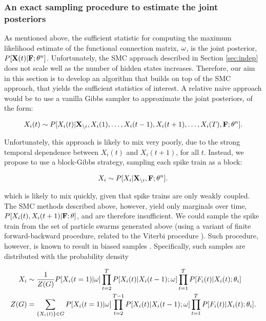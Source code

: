 \subsubsection{An exact sampling procedure to estimate the joint posteriors}

As mentioned above, the sufficient statistic for computing the maximum likelihood estimate of the functional connection matrix, $\mathbf{\omega}$, is the joint posterior, $P[{\bf X}(t) | {\bf F}; \mathbf{\theta}^n]$.  Unfortunately, the SMC approach described in Section \ref{sec:indep} does not scale well as the number of hidden states increases.  Therefore, our aim in this section is to develop an algorithm that builds on top of the SMC approach, that yields the sufficient statistics of interest.  A relative naive approach would be to use a vanilla Gibbs sampler to approximate the joint posteriors, of the form:

\begin{align}
	X_i(t) \sim P[X_i(t) | {\bf X}_{\backslash i}, X_i(1), \ldots, X_i(t-1), X_i(t+1), \ldots, X_i(T), {\bf F}; \mathbf{\theta}^n].
\end{align} 

\noindent Unfortunately, this approach is likely to mix very poorly, due to the strong temporal dependence between $X_i(t)$ and $X_i(t+1)$, for all $t$.  Instead, we propose to use a block-Gibbs strategy, sampling each spike train as a block:

\begin{align}
	X_i \sim P[X_i | {\bf X}_{\backslash i}, {\bf F}; \mathbf{\theta}^n].
\end{align} 

\noindent which is likely to mix quickly, given that spike trains are only weakly coupled. The SMC methods described above, however, yield only marginals over time, $P[X_i(t), X_i(t+1) | {\bf F}; \mathbf{\theta}]$, and are therefore insufficient.  We could sample the spike train from the set of particle swarms generated above (using a variant of finite forward-backward procedure, related to the Viterbi procedure \cite{RAB89}).  Such procedure, however, is known to result in biased samples \cite{Andrieu2007, NBR03}.  Specifically, such samples are distributed with the probability density

\begin{align}
X_i &\sim \frac{1}{Z(G)} P[X_i(t=1)| \mathbf{\omega}]\prod\limits_{t=2}^{T}P[X_i(t)| X_i(t-1); \mathbf{\omega}] \prod_{t=1}^{T} P[F_i(t)|X_i(t); \mathbf{\theta}_i] \\
Z(G) &= \sum_{\{X_i(t)\}\in G} P[X_i(t=1)| \mathbf{\omega}] \prod_{t=2}^{T-1}P[X_i(t)|X_i(t-1); \mathbf{\omega}] \prod_{t=1}^{T}P[F_i(t)|X_i(t); \mathbf{\theta}_i].
\end{align}

